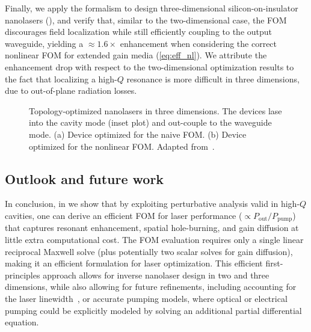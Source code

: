 Finally, we apply the formalism to design three-dimensional silicon-on-insulator nanolasers (), 
and verify that, similar to the two-dimensional case, the FOM discourages field localization while still efficiently coupling to the output waveguide, yielding a $\approx 1.6\times$
enhancement when considering the correct nonlinear FOM for extended gain media (\eqref{eq:eff_nl}). We attribute the enhancement drop with respect to the two-dimensional optimization results to the fact that localizing a high-$Q$ resonance is more difficult in three dimensions, due to out-of-plane radiation losses.

\begin{figure}[tb]
    \centering
    \caption{Topology-optimized nanolasers in three dimensions. The devices lase into the cavity mode (inset plot) and out-couple to the waveguide mode. (a) Device optimized for the naive FOM. (b) Device optimized for the nonlinear FOM.
    Adapted from~\cite{ownpub4}.}
    \label{fig:laser3d}
\end{figure}

\subsection*{Outlook and future work}

In conclusion, in \cite{ownpub4} we show that by exploiting perturbative analysis valid in high-$Q$ cavities, one can derive  
an efficient FOM for laser performance ($\propto P_\text{out}/P_\text{pump}$) that captures resonant enhancement,  
spatial hole-burning, and gain diffusion at little extra computational cost. The FOM evaluation requires only a  
single linear reciprocal Maxwell solve (plus potentially two scalar solves for gain diffusion), making it 
an efficient formulation for laser optimization. This efficient first-principles approach allows for inverse nanolaser design in two and three dimensions, while  
also allowing for future refinements, including accounting for the laser linewidth~\cite{pick}, or accurate pumping models, where optical or electrical pumping could be explicitly
modeled by solving an additional partial differential equation.
